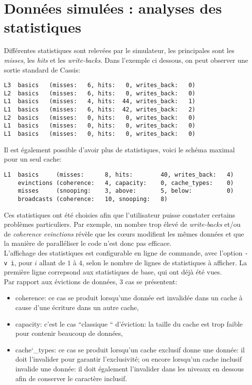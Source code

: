 \section{Données simulées : analyses des statistiques}

Différentes statistiques sont relevées par le simulateur, les principales sont les \emph{misses}, les \emph{hits} et les \emph{write-backs}. Dans l'exemple ci dessous, on peut observer une sortie standard de \textsf{Cassis}:
\begin{lstlisting}
L3  basics   (misses:   6, hits:   0, writes_back:   0)
L2  basics   (misses:   6, hits:   0, writes_back:   0)
L1  basics   (misses:   4, hits:  44, writes_back:   1)
L1  basics   (misses:   6, hits:  42, writes_back:   2)
L2  basics   (misses:   0, hits:   0, writes_back:   0)
L1  basics   (misses:   0, hits:   0, writes_back:   0)
L1  basics   (misses:   0, hits:   0, writes_back:   0)
\end{lstlisting}


Il est également possible d'avoir plus de statistiques, voici le schéma maximal pour un seul cache:
\begin{lstlisting}
L1  basics     (misses:      8, hits:        40, writes_back:   4)
    evinctions (coherence:   4, capacity:    0, cache_types:    0)
    misses     (snooping:    3, above:       5, below:          0)
    broadcasts (coherence:   10, snooping:   8)
\end{lstlisting}


Ces statistiques ont été choisies afin que l'utilisateur puisse constater certains problèmes particuliers. Par exemple, un nombre trop élevé de \emph{write-backs} et/ou de \emph{coherence evinctions} révèle que les c\oe urs modifient les mêmes données et que la manière de paralléliser le code n'est donc pas efficace. \\

L'affichage des statistiques est configurable en ligne de commande, avec l'option \texttt{-v i}, pour $i$ allant de $1$ à $4$, selon le nombre de lignes de statistiques à afficher. La première ligne correpsond aux statistiques de base, qui ont déjà été vues. \\

Par rapport aux évictions de données, $3$ cas se présentent:
\begin{itemize}
\item coherence: ce cas se produit lorsqu'une donnée est invalidée dans un cache à cause d'une écriture dans un autre cache,
\item capacity: c'est le cas ``classique `` d'éviction: la taille du cache est trop faible pour contenir beaucoup de données,
\item cache\char`_types: ce cas se produit lorsqu'un cache exclusif donne une donnée: il doit l'invalider pour garantir l'exclusivité; ou encore lorsqu'un cache inclusif invalide une donnée: il doit également l'invalider dans les niveaux en dessous afin de conserver le caractère inclusif. \\ 
\end{itemize}

